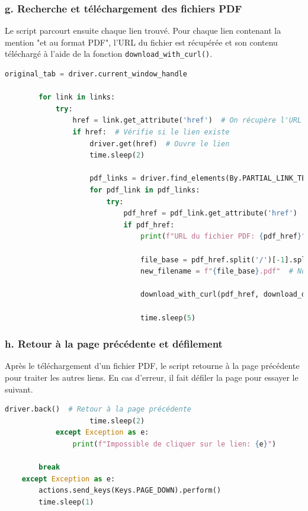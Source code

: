 \newpage
\subsubsection{g. Recherche et téléchargement des fichiers PDF}

Le script parcourt ensuite chaque lien trouvé. Pour chaque lien contenant la mention "et au format PDF", l'URL du fichier est récupérée et son contenu téléchargé à l'aide de la fonction \texttt{download\_with\_curl()}.

\begin{lstlisting}[language=Python]
        original_tab = driver.current_window_handle

        for link in links:
            try:
                href = link.get_attribute('href')  # On récupère l'URL du lien
                if href:  # Vérifie si le lien existe
                    driver.get(href)  # Ouvre le lien
                    time.sleep(2)

                    pdf_links = driver.find_elements(By.PARTIAL_LINK_TEXT, "et au format PDF")
                    for pdf_link in pdf_links:
                        try:
                            pdf_href = pdf_link.get_attribute('href')
                            if pdf_href:
                                print(f"URL du fichier PDF: {pdf_href}")

                                file_base = pdf_href.split('/')[-1].split('.')[0]  # Nom du fichier
                                new_filename = f"{file_base}.pdf"  # Nouveau nom du fichier

                                download_with_curl(pdf_href, download_dir, new_filename)

                                time.sleep(5)
\end{lstlisting}

\newpage
\subsubsection{h. Retour à la page précédente et défilement}

Après le téléchargement d'un fichier \gls{PDF}, le script retourne à la page précédente pour traiter les autres liens. En cas d'erreur, il fait défiler la page pour essayer le suivant.

\begin{lstlisting}[language=Python]
                    driver.back()  # Retour à la page précédente
                    time.sleep(2)
            except Exception as e:
                print(f"Impossible de cliquer sur le lien: {e}")

        break
    except Exception as e:
        actions.send_keys(Keys.PAGE_DOWN).perform()
        time.sleep(1)
\end{lstlisting}


